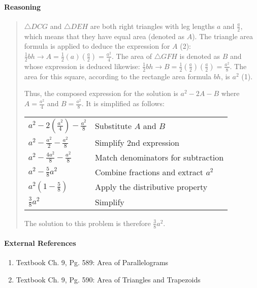 \documentclass[letterpaper,12pt,twoside]{report}
\begin{document}
	\paragraph{Reasoning}
	\begin{quotation}
	
	$\triangle DCG$ and $\triangle DEH$ are both right triangles with leg lengths $a$ and $\frac{a}{2}$, which means that they have equal area (denoted as $A$). The triangle area formula is applied to deduce the expression for $A$ (2): $\frac{1}{2}bh \rightarrow A=\frac{1}{2}(a)(\frac{a}{2})=\frac{a^2}{4}$. The area of $\triangle GFH$ is denoted as $B$ and whose expression is deduced likewise: $\frac{1}{2}bh \rightarrow B=\frac{1}{2}(\frac{a}{2})(\frac{a}{2})=\frac{a^2}{8}$. The area for this square, according to the rectangle area formula $bh$, is $a^2$ (1).
	
	Thus, the composed expression for the solution is $a^2-2A-B$ where $A=\frac{a^2}{4}$ and $B=\frac{a^2}{8}$. It is simplified as follows:
	\begin{center}
		\begin{tabular}{l | l}
			$a^2-2(\frac{a^2}{4})-\frac{a^2}{8}$ & Substitute $A$ and $B$ \\
			$a^2-\frac{a^2}{2}-\frac{a^2}{8}$ & Simplify 2nd expression \\
			$a^2-\frac{4a^2}{8}-\frac{a^2}{8}$ & Match denominators for subtraction \\
			$a^2-\frac{5}{8}a^2$ & Combine fractions and extract $a^2$ \\
			$a^2(1-\frac{5}{8})$ & Apply the distributive property \\
			$\frac{3}{8}a^2$ & Simplify \\
		\end{tabular}
	\end{center}
	
	The solution to this problem is therefore $\boxed{\frac{3}{8}a^2}$.
	\end{quotation}
	
	\paragraph{External References}
	
	\begin{enumerate}
		\item Textbook Ch. 9, Pg. 589: Area of Parallelograms
		\item Textbook Ch. 9, Pg. 590: Area of Triangles and Trapezoids
	\end{enumerate}
\end{document}
